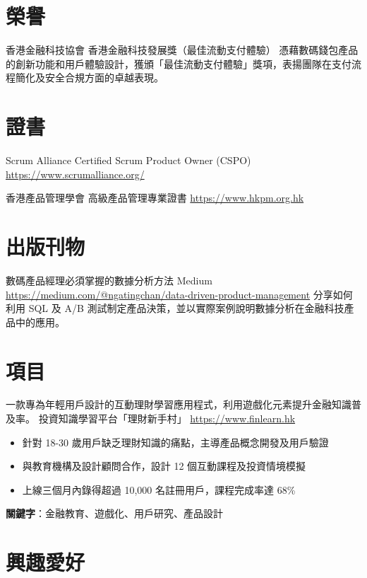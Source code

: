 \documentclass[a4paper, serif, 10pt]{moderncv}
\begin{document}
\section{榮譽}

        {香港金融科技協會}
        {香港金融科技發展獎（最佳流動支付體驗）}
        {}
        {}
        {憑藉數碼錢包產品的創新功能和用戶體驗設計，獲頒「最佳流動支付體驗」獎項，表揚團隊在支付流程簡化及安全合規方面的卓越表現。}
\section{證書}

        {Scrum Alliance}
        {Certified Scrum Product Owner (CSPO)}
        {\url{https://www.scrumalliance.org/}}
        {}
        {}

        {香港產品管理學會}
        {高級產品管理專業證書}
        {\url{https://www.hkpm.org.hk}}
        {}
        {}
\section{出版刊物}

        {數碼產品經理必須掌握的數據分析方法}
        {Medium}
        {\url{https://medium.com/@ngatingchan/data-driven-product-management}}
        {}
        {分享如何利用 SQL 及 A/B 測試制定產品決策，並以實際案例說明數據分析在金融科技產品中的應用。}
\section{項目}

        {一款專為年輕用戶設計的互動理財學習應用程式，利用遊戲化元素提升金融知識普及率。}
        {投資知識學習平台「理財新手村」}
        {\url{https://www.finlearn.hk}}
        {}
        {\begin{itemize}
\item 針對 18-30 歲用戶缺乏理財知識的痛點，主導產品概念開發及用戶驗證
\item 與教育機構及設計顧問合作，設計 12 個互動課程及投資情境模擬
\item 上線三個月內錄得超過 10,000 名註冊用戶，課程完成率達 68\%
\end{itemize}
\textbf{關鍵字}：金融教育、遊戲化、用戶研究、產品設計}
\section{興趣愛好}
\end{document}

